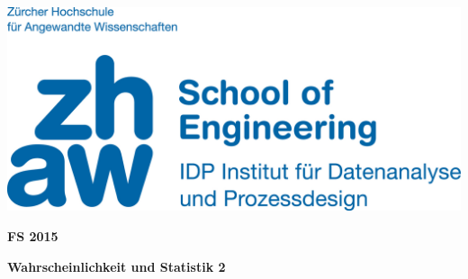 \noindent
\begin{minipage}[t]{0.4\textwidth} 
\includegraphics[width=\linewidth]{logo.jpg}
\end{minipage}%
\hfill%
\begin{minipage}[t]{0.4\textwidth}\raggedleft
\textbf{\large FS 2015}
\end{minipage}

\begin{center}
 \textbf{\large Wahrscheinlichkeit und Statistik 2} \\
 \vspace{0.3cm}
\end{center}

